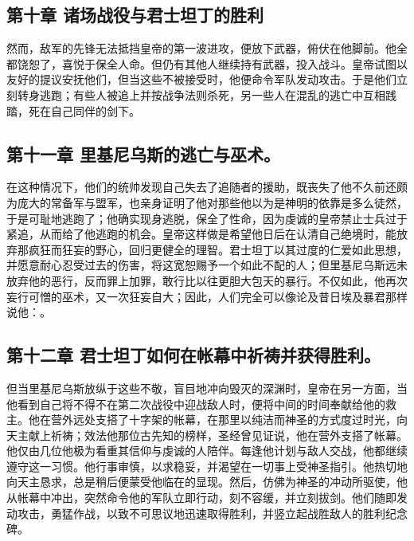 
\subsection{第十章 诸场战役与君士坦丁的胜利}

然而，敌军的先锋无法抵挡皇帝的第一波进攻，便放下武器，俯伏在他脚前。他全都饶恕了，喜悦于保全人命。但仍有其他人继续持有武器，投入战斗。皇帝试图以友好的提议安抚他们，但当这些不被接受时，他便命令军队发动攻击。于是他们立刻转身逃跑；有些人被追上并按战争法则杀死，另一些人在混乱的逃亡中互相践踏，死在自己同伴的剑下。\par


\subsection{第十一章 里基尼乌斯的逃亡与巫术。}

在这种情况下，他们的统帅发现自己失去了追随者的援助，既丧失了他不久前还颇为庞大的常备军与盟军，也亲身证明了他对那些他以为是神明的依靠是多么徒然，于是可耻地逃跑了；他确实现身逃脱，保全了性命，因为虔诚的皇帝禁止士兵过于紧追，从而给了他逃跑的机会。皇帝这样做是希望他日后在认清自己绝境时，能放弃那疯狂而狂妄的野心，回归更健全的理智。君士坦丁以其过度的仁爱如此思想，并愿意耐心忍受过去的伤害，将这宽恕赐予一个如此不配的人；但里基尼乌斯远未放弃他的恶行，反而罪上加罪，敢行比以往更胆大包天的暴行。不仅如此，他再次妄行可憎的巫术，又一次狂妄自大；因此，人们完全可以像论及昔日埃及暴君那样说他：。\par


\subsection{第十二章 君士坦丁如何在帐幕中祈祷并获得胜利。}

但当里基尼乌斯放纵于这些不敬，盲目地冲向毁灭的深渊时，皇帝在另一方面，当他看到自己将不得不在第二次战役中迎战敌人时，便将中间的时间奉献给他的救主。他在营外远处支搭了十字架的帐幕，在那里以纯洁而神圣的方式度过时光，向天主献上祈祷；效法他那位古先知的榜样，圣经曾见证说，他在营外支搭了帐幕。他仅由几位他极为看重其信仰与虔诚的人陪伴。每逢他计划与敌人交战，他都继续遵守这一习惯。他行事审慎，以求稳妥，并渴望在一切事上受神圣指引。他热切地向天主恳求，总是稍后便蒙受他临在的显现。然后，仿佛为神圣的冲动所驱使，他从帐幕中冲出，突然命令他的军队立即行动，刻不容缓，并立刻拔剑。他们随即发动攻击，勇猛作战，以致不可思议地迅速取得胜利，并竖立起战胜敌人的胜利纪念碑。\par

